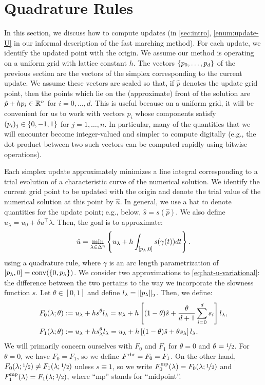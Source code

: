 \documentclass[eikonal.tex]{subfiles}
\begin{document}
\section{Quadrature Rules}

In this section, we discuss how to compute updates (in
\cref{sec:intro}, \cref{enum:update-U} in our informal description of
the fast marching method). For each update, we identify the updated
point with the origin. We assume our method is operating on a uniform
grid with lattice constant $h$. The vectors $\left\{p_0, \hdots, p_d\right\}$
of the previous section are the vectors of the simplex corresponding
to the current update. We assume these vectors are scaled so that, if
$\hat{p}$ denotes the update grid point, then the points which lie on
the (approximate) front of the solution are $\hat{p} + h p_i \in \mathbb{R}^n$
for $i = 0, \hdots, d$. This is useful because on a uniform grid, it
will be convenient for us to work with vectors $p_i$ whose components
satisfy $(p_i)_j \in \left\{0, -1, 1\right\}$ for $j = 1, \hdots, n$. In
particular, many of the quantities that we will encounter become
integer-valued and simpler to compute digitally (e.g., the dot product
between two such vectors can be computed rapidly using bitwise
operations).

Each simplex update approximately minimizes a line integral
corresponding to a trial evolution of a characteristic curve of the
numerical solution. We identify the current grid point to be updated
with the origin and denote the trial value of the numerical solution
at this point by $\hat{u}$. In general, we use a hat to denote
quantities for the update point; e.g., below, $\hat{s} =
s(\hat{p})$. We also define $u_\lambda = u_0 + \delta u^\top
\lambda$. Then, the goal is to approximate:
\begin{equation}
  \hat{u} = \min_{\lambda \in \Delta^n} \left\{u_\lambda + h \int_{[p_\lambda, 0]} s(\gamma(t))dt\right\}.\label{eq:hat-u-variational}
\end{equation}
using a quadrature rule, where $\gamma$ is an arc length
parametrization of
$[p_\lambda, 0] = \operatorname{conv}(\left\{0, p_\lambda\right\})$. We
consider two approximations to \cref{eq:hat-u-variational}: the
difference between the two pertains to the way we incorporate the
slowness function $s$. Let $\theta \in [0, 1]$ and define
$l_\lambda = \left\|p_\lambda\right\|_2$. Then, we define:
\begin{align*}
  F_0(\lambda; \theta) &:= u_\lambda + h s^{\theta} l_\lambda = u_\lambda + h \left[(1-\theta)\hat{s} + \frac{\theta}{d + 1} \sum_{i=0}^d s_i\right] l_\lambda, \\
  F_1(\lambda; \theta) &:= u_\lambda + h s^{\theta}_\lambda l_\lambda = u_\lambda + h \left[(1-\theta)\hat{s} + \theta s_\lambda\right] l_\lambda.
\end{align*}
We will primarily concern ourselves with $F_0$ and $F_1$ for
$\theta = 0$ and $\theta = \nicefrac{1}{2}$. For $\theta = 0$, we have
$F_0 = F_1$, so we define $F^{\operatorname{rhr}} = F_0 = F_1$. On the other hand,
$F_0(\lambda;\nicefrac{1}{2}) \neq F_1(\lambda;\nicefrac{1}{2})$
unless $s \equiv 1$, so we write
$F_0^{\operatorname{mp}}(\lambda) = F_0(\lambda; \nicefrac{1}{2})$ and
$F_1^{\operatorname{mp}}(\lambda) = F_1(\lambda; \nicefrac{1}{2})$, where ``mp''
stands for ``midpoint''.
\end{document}

